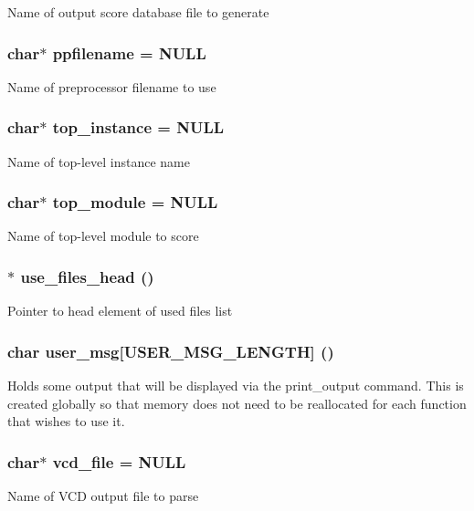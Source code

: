 Name of output score database file to generate 
\subsubsection{\setlength{\rightskip}{0pt plus 5cm}char$\ast$ ppfilename = NULL}\label{score_8c_a5}


Name of preprocessor filename to use 
\subsubsection{\setlength{\rightskip}{0pt plus 5cm}char$\ast$ top\_\-instance = NULL}\label{score_8c_a1}


Name of top-level instance name 
\subsubsection{\setlength{\rightskip}{0pt plus 5cm}char$\ast$ top\_\-module = NULL}\label{score_8c_a0}


Name of top-level module to score 
\subsubsection{$\ast$ use\_\-files\_\-head ()}\label{score_8c_a9}


Pointer to head element of used files list 
\subsubsection{\setlength{\rightskip}{0pt plus 5cm}char user\_\-msg[USER\_\-MSG\_\-LENGTH] ()}\label{score_8c_a10}


Holds some output that will be displayed via the print\_\-output command. This is created globally so that memory does not need to be reallocated for each function that wishes to use it. 
\subsubsection{\setlength{\rightskip}{0pt plus 5cm}char$\ast$ vcd\_\-file = NULL}\label{score_8c_a3}


Name of VCD output file to parse 